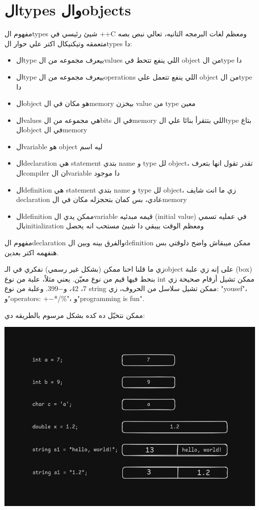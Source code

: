 \documentclass[11pt]{article}
\begin{document}
\section{الtypes والobjects}
\label{sec:org335fa8a}
مفهوم الtypes شيئ رئيسي في ++C ومعظم لغات البرمجه التانيه، تعالي نبص بصه متعمقه وتيكنيكال اكتر علي حوار الtypes دا:
\begin{itemize}
\item الtype بيعرف مجموعه من الvalues اللي ينفع تتحط في object من الtype دا
\item الtype بيعرف مجموعه من الoperations اللي ينفع تتعمل علي object من الtype دا
\item الobject هو مكان في الmemory بيخزن value من type معين
\item الvalues هي مجموعه من الbits في الmemory اللي بتتقرأ بنائا علي الtype بتاع الobject في الmemory
\item الvariable هو object ليه اسم
\item الdeclaration هي statement بتدي name و type لل object، تقدر تقول انها بتعرف الcompiler ان الvariable دا موجود
\item الdefinition هي statement بتدي name و type لل object، زي ما انت شايف declaration عادي، بس كمان بتحجزله مكان في الmemory
\item الdefinition ممكن يدي الvariable قيمه مبدئيه (initial value) في عمليه تسمي بالinitialization ومعظم الوقت بيبقي دا شيئ مستحب انه يحصل
\end{itemize}

مفهوم الdeclaration والفرق بينه وبين الdefinition ممكن ميبقاش واضح دلوقتي بس هنفهمه اكتر بعدين.

زي ما قلنا احنا ممكن (بشكل غير رسمي) نفكري في الـobject على إنه زي علبة (box) بنحط فيها قيم من نوع معيّن.
يعني مثلاً، علبة من نوع int ممكن تشيل أرقام صحيحة زي 7، 42، و−399.
وعلبة من نوع string ممكن تشيل سلاسل من الحروف، زي:
"yousef"، و"operators: +−*/\%"، و"programming is fun".

ممكن نتخيّل ده كده بشكل مرسوم بالطريقه دي:

\begin{center}
\includegraphics[width=.9\linewidth]{../images/variables_as_containers.png}
\end{center}
\end{document}
